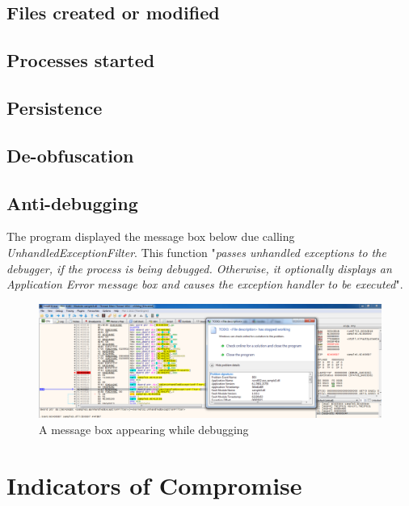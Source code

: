 \documentclass{article}
\begin{document}
    \subsection{Files created or modified}
    \subsection{Processes started}
    \subsection{Persistence}
    \subsection{De-obfuscation}
    \subsection{Anti-debugging}
    The program displayed the message box below due calling \textit{UnhandledExceptionFilter}. This function "\textit{passes unhandled exceptions to the debugger, if the process is being debugged. Otherwise, it optionally displays an Application Error message box and causes the exception handler to be executed}"\Cite{unhandledFilter}.
    \begin{figure}[H]
        \includegraphics[width=\textwidth]{mesgbox2.png}
        \caption{A message box appearing while debugging}
    \end{figure}
    \pagebreak
    \section{Indicators of Compromise}
    \pagebreak
    \printbibliography
\end{document}
